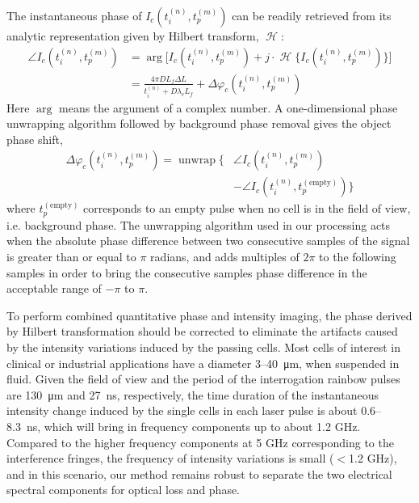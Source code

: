 \documentclass[aps,pra,reprint,superscriptaddress]{revtex4-1}
\DeclareMathOperator{\hilbert}{\mathcal{H}} %
\DeclareMathOperator{\unwrap}{unwrap} %
\begin{document}
The instantaneous phase of $I_c(t_i^{(n)}, t_p^{(m)})$ can be readily retrieved from its analytic representation given by Hilbert transform, $\hilbert$:
\begin{equation} \label{eqn:angle}
\begin{split}
\angle I_c(t_i^{(n)}, t_p^{(m)}) &= \arg\Big[I_c(t_i^{(n)}, t_p^{(m)}) + j \cdot \hilbert \lbrace I_c(t_i^{(n)}, t_p^{(m)}) \rbrace\Big] \\
&=  \frac{4\pi D L_f\Delta L}{t_i^{(n)} + D\lambda_c L_f} + \Delta \varphi_c(t_i^{(n)}, t_p^{(m)})
\end{split}
\end{equation}
Here $\arg$ means the argument of a complex number. A one-dimensional phase unwrapping algorithm followed by background phase removal gives the object phase shift, 
\begin{equation}
\begin{split}
\Delta\varphi_c(t_i^{(n)}, t_p^{(m)}) = \unwrap \lbrace &\angle I_c(t_i^{(n)}, t_p^{(m)}) \\
&- \angle I_c(t_i^{(n)}, t_p^{(\text{empty})}) \rbrace
\end{split}
\end{equation}
where $t_p^{(\text{empty})}$ corresponds to an empty pulse when no cell is in the field of view, i.e. background phase. The unwrapping algorithm used in our processing acts when the absolute phase difference between two consecutive samples of the signal is greater than or equal to $\pi$ radians, and adds multiples of $2\pi$ to the following samples in order to bring the consecutive samples phase difference in the acceptable range of $-\pi$ to $\pi$. 

To perform combined quantitative phase and intensity imaging, the phase derived by Hilbert transformation should be corrected to eliminate the artifacts caused by the intensity variations induced by the passing cells. Most cells of interest in clinical or industrial applications have a diameter 3--\SI{40}{\micro\meter}, when suspended in fluid. Given the field of view and the period of the interrogation rainbow pulses are \SI{130}{\micro\meter} and \SI{27}{\nano\second}, respectively, the time duration of the instantaneous intensity change induced by the single cells in each laser pulse is about 0.6--\SI{8.3}{\nano\second}, which will bring in frequency components up to about 1.2 GHz. Compared to the higher frequency components at 5 GHz corresponding to the interference fringes, the frequency of intensity variations is small ($<$1.2 GHz), and in this scenario, our method remains robust to separate the two electrical spectral components for optical loss and phase.
\end{document}
